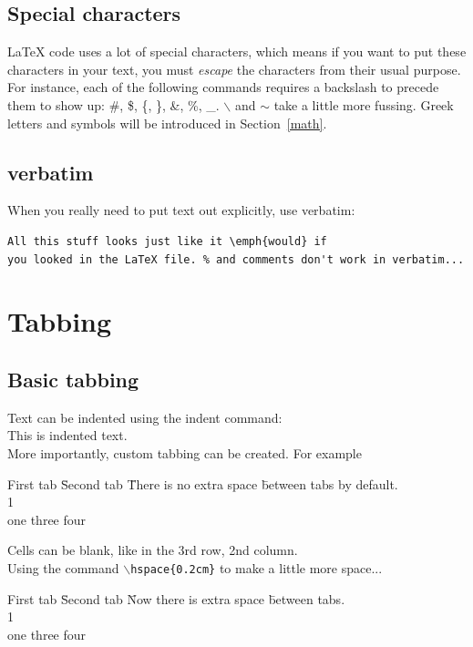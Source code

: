 \documentclass[11pt]{article} %
\begin{document}
\subsection{Special characters}

LaTeX code uses a lot of special characters, which means if you want to put these characters in your text, you must \emph{escape} the characters from their usual purpose. For instance, each of the following commands requires a backslash to precede them to show up: \#, \$, \{, \}, \&, \%, \_. $\backslash$ and $\sim$ take a little more fussing. Greek letters and symbols will be introduced in Section~\ref{math}.

\subsection{verbatim}

When you really need to put text out explicitly, use verbatim:
\begin{verbatim}
All this stuff looks just like it \emph{would} if
you looked in the LaTeX file. % and comments don't work in verbatim...
\end{verbatim}

\section{Tabbing}
\label{tabbing}

\subsection{Basic tabbing}

Text can be indented using the indent command: \\
\indent\indent\indent This is indented text. \\

More importantly, custom tabbing can be created. For example
\begin{tabbing}
First tab \= Second tab \= There is no extra space \= between tabs by default. \\
1    \\
one \> \> three \> four
\end{tabbing}
Cells can be blank, like in  the 3rd row, 2nd column. \\

Using the command \texttt{$\backslash$hspace\{0.2cm\}} to make a little more space...
\begin{tabbing}
First tab\hspace{0.2cm} \= Second tab\hspace{0.2cm} \= Now there is extra space\hspace{0.2cm} \= between tabs. \\
1    \\
one \> \> three \> four
\end{tabbing}
\end{document}
